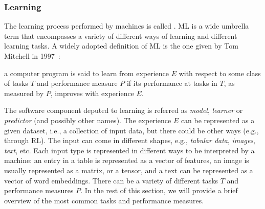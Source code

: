 \subsubsection{Learning}\label{subsubsec:machine-learning-cs}
%
The learning process performed by machines is called .
%
\gls{ML} is a wide umbrella term that encompasses a variety of different ways of learning and different learning tasks.
%
A widely adopted definition of \gls{ML} is the one given by Tom Mitchell in 1997~\cite{DBLP:books/daglib/0087929}:
%
\begin{definition}
    \label{def:ml}
    a computer program is said to learn from experience $E$ with respect to some class of tasks $T$ and performance measure $P$ if its performance at tasks in $T$, as measured by $P$, improves with experience $E$.
\end{definition}
%
The software component deputed to learning is referred as \emph{model}, \emph{learner} or \emph{predictor} (and possibly other names).
%
The experience $E$ can be represented as a given dataset, i.e., a collection of input data, but there could be other ways (e.g., through \gls{RL}).
%
The input can come in different shapes, e.g., \emph{tabular data}, \emph{images}, \emph{text}, etc.
%
Each input type is represented in different ways to be interpreted by a machine: an entry in a table is represented as a vector of features, an image is usually represented as a matrix, or a tensor, and a text can be represented as a vector of word embeddings.
%
There can be a variety of different tasks $T$ and performance measures $P$.
%
In the rest of this section, we will provide a brief overview of the most common tasks and performance measures.


